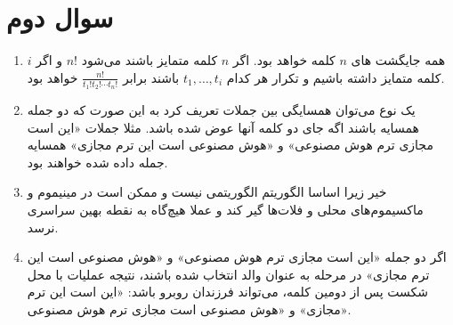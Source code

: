 \documentclass{article}
\begin{document}
	\section*{
		سوال دوم
	}
	\begin{enumerate}
		\item 
	 	همه جایگشت های $n$ کلمه خواهد بود. اگر $n$ کلمه متمایز باشند می‌شود $n!$ و اگر $i$ کلمه متمایز داشته باشیم و  تکرار هر کدام 
	 	$t_1, \dots , t_i$
	 	باشند برابر
	 	$\frac{n!}{t_1!t_2!\cdots t_n!}$
	 	خواهد بود.
	 	\item 
	 	یک نوع می‌توان همسایگی بین جملات تعریف کرد به این صورت که دو جمله همسایه باشند اگه جای دو کلمه آنها عوض شده باشد. مثلا جملات «این است مجازی ترم هوش مصنوعی» و «هوش مصنوعی است این ترم مجازی» همسایه جمله داده شده خواهند بود.
	 	\item 
	 	خیر زیرا اساسا الگوریتم 
	 	الگوریتمی
	 	نیست و ممکن است در مینیموم و ماکسیموم‌های محلی و فلات‌ها گیر کند و عملا هیچ‌گاه به نقطه بهین سراسری نرسد.
	 	\item 
	 	اگر دو جمله «این است مجازی ترم هوش مصنوعی» و «هوش مصنوعی است این ترم مجازی» در مرحله
	 	به عنوان والد انتخاب شده باشند، نتیجه عملیات 
	 	با محل شکست پس از دومین کلمه، می‌تواند فرزندان روبرو باشد: «این است این ترم مجازی» و «هوش مصنوعی است مجازی ترم هوش مصنوعی».
	 	
	\end{enumerate}
\end{document}
